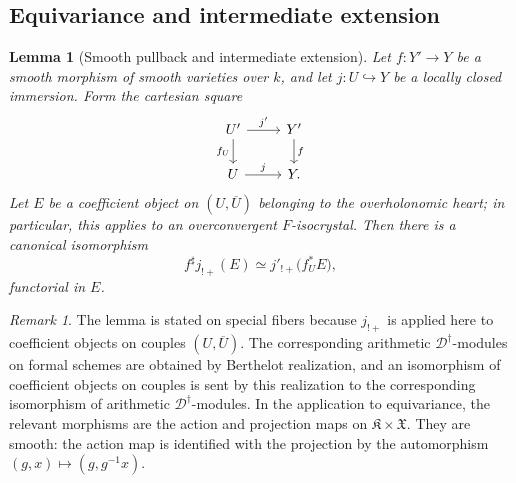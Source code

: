 \documentclass[11pt]{amsart}
\theoremstyle{plain}
\newtheorem{lemma}{Lemma}[section]
\theoremstyle{definition}
\theoremstyle{remark}
\newtheorem{remark}{Remark}[section]
\begin{document}
\subsection{Equivariance and intermediate extension}

\begin{lemma}[Smooth pullback and intermediate extension]
\label{lem:smooth-pullback-intermediate-extension}
Let \(f:Y'\to Y\) be a smooth morphism of smooth varieties over \(k\), and let
\(j:U\hookrightarrow Y\) be a locally closed immersion. Form the cartesian
square
\[
\begin{tikzcd}
  U' \arrow[r,"j'"] \arrow[d,"f_U"'] &
  Y' \arrow[d,"f"] \\
  U \arrow[r,"j"] &
  Y.
\end{tikzcd}
\]
Let \(E\) be a coefficient object on \((U,\overline U)\) belonging to the
overholonomic heart; in particular, this applies to an overconvergent
\(F\)-isocrystal. Then there is a canonical isomorphism
\[
  f^\sharp j_{!+}(E)
  \simeq
  j'_{!+}\bigl(f_U^*E\bigr),
\]
functorial in \(E\).
\end{lemma}

\begin{remark}
\label{rem:smooth-pullback-intermediate-extension-special-fiber}
The lemma is stated on special fibers because \(j_{!+}\) is applied here to
coefficient objects on couples \((U,\overline U)\). The corresponding
arithmetic \(\mathscr D^\dagger\)-modules on formal schemes are obtained by
Berthelot realization, and an isomorphism of coefficient objects on couples is
sent by this realization to the corresponding isomorphism of arithmetic
\(\mathscr D^\dagger\)-modules. In the application to equivariance, the
relevant morphisms are the action and projection maps on
\(\mathfrak K\times\mathfrak X\). They are smooth: the action map is identified
with the projection by the automorphism \((g,x)\mapsto(g,g^{-1}x)\).
\end{remark}
\end{document}
